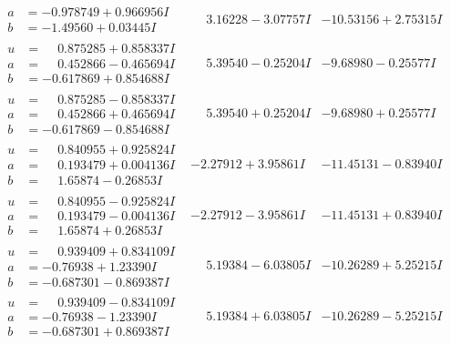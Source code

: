\documentclass[1p]{elsarticle_modified}
\theoremstyle{definition}
\begin{document}
$$\begin{array}{c|c|c}
\begin{aligned}
a &= -0.978749 + 0.966956 I \\
b &= -1.49560 + 0.03445 I\end{aligned}
 & \phantom{-}3.16228 - 3.07757 I & -10.53156 + 2.75315 I \\ \hline\begin{aligned}
u &= \phantom{-}0.875285 + 0.858337 I \\
a &= \phantom{-}0.452866 - 0.465694 I \\
b &= -0.617869 + 0.854688 I\end{aligned}
 & \phantom{-}5.39540 - 0.25204 I & -9.68980 - 0.25577 I \\ \hline\begin{aligned}
u &= \phantom{-}0.875285 - 0.858337 I \\
a &= \phantom{-}0.452866 + 0.465694 I \\
b &= -0.617869 - 0.854688 I\end{aligned}
 & \phantom{-}5.39540 + 0.25204 I & -9.68980 + 0.25577 I \\ \hline\begin{aligned}
u &= \phantom{-}0.840955 + 0.925824 I \\
a &= \phantom{-}0.193479 + 0.004136 I \\
b &= \phantom{-}1.65874 - 0.26853 I\end{aligned}
 & -2.27912 + 3.95861 I & -11.45131 - 0.83940 I \\ \hline\begin{aligned}
u &= \phantom{-}0.840955 - 0.925824 I \\
a &= \phantom{-}0.193479 - 0.004136 I \\
b &= \phantom{-}1.65874 + 0.26853 I\end{aligned}
 & -2.27912 - 3.95861 I & -11.45131 + 0.83940 I \\ \hline\begin{aligned}
u &= \phantom{-}0.939409 + 0.834109 I \\
a &= -0.76938 + 1.23390 I \\
b &= -0.687301 - 0.869387 I\end{aligned}
 & \phantom{-}5.19384 - 6.03805 I & -10.26289 + 5.25215 I \\ \hline\begin{aligned}
u &= \phantom{-}0.939409 - 0.834109 I \\
a &= -0.76938 - 1.23390 I \\
b &= -0.687301 + 0.869387 I\end{aligned}
 & \phantom{-}5.19384 + 6.03805 I & -10.26289 - 5.25215 I \\ \hline\begin{aligned}

\end{aligned}
\end{array}$$
\end{document}
